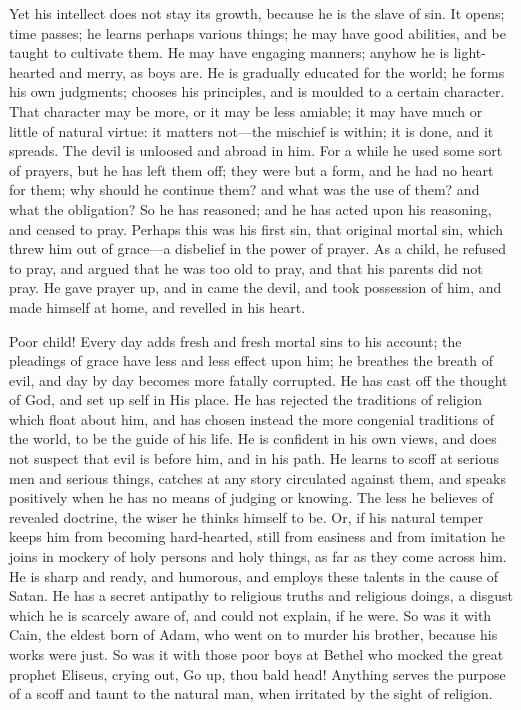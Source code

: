 Yet his intellect does not stay its growth, because he is the slave
of sin. It opens; time passes; he learns perhaps various things; he
may have good abilities, and be taught to cultivate them. He may have
engaging manners; anyhow he is light-hearted and merry, as boys are.
He is gradually educated for the world; he forms his own judgments;
chooses his principles, and is moulded to a certain character. That
character may be more, or it may be less amiable; it may have much or
little of natural virtue: it matters not—the mischief is within; it
is done, and it spreads. The devil is unloosed and abroad in him. For
a while he used some sort of prayers, but he has left them off; they
were but a form, and he had no heart for them; why should he continue
them? and what was the use of them? and what the obligation? So he has
reasoned; and he has acted upon his reasoning, and ceased to pray.
Perhaps this was his first sin, that original mortal sin, which threw
him out of grace—a disbelief in the power of prayer. As a child, he
refused to pray, and argued that he was too old to pray, and that his
parents did not pray. He gave prayer up, and in came the devil, and
took possession of him, and made himself at home, and revelled in his
heart.

Poor child! Every day adds fresh and fresh mortal sins to his
account; the pleadings of grace have less and less effect upon him; he
breathes the breath of evil, and day by day becomes more fatally
corrupted. He has cast off the thought of God, and set up self in His
place. He has rejected the traditions of religion which float about
him, and has chosen instead the more congenial traditions of the
world, to be the guide of his life. He is confident in his own views,
and does not suspect that evil is before him, and in his path. He
learns to scoff at serious men and serious things, catches at any
story circulated against them, and speaks positively when he has no
means of judging or knowing. The less he believes of revealed
doctrine, the wiser he thinks himself to be. Or, if his natural temper
keeps him from becoming hard-hearted, still from easiness and from
imitation he joins in mockery of holy persons and holy things, as far
as they come across him. He is sharp and ready, and humorous, and
employs these talents in the cause of Satan. He has a secret antipathy
to religious truths and religious doings, a disgust which he is
scarcely aware of, and could not explain, if he were. So was it with
Cain, the eldest born of Adam, who went on to murder his brother,
because his works were just. So was it with those poor boys at Bethel
who mocked the great prophet Eliseus, crying out, Go up, thou bald
head! Anything serves the purpose of a scoff and taunt to the natural
man, when irritated by the sight of religion.

